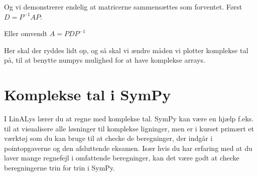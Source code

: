 \documentclass[letterpaper,10pt,english]{jupyterBook}
\begin{document}
\begin{sphinxVerbatim}[commandchars=\\\{\}]
   
 
\end{sphinxVerbatim}

\noindent{}

\noindent{}

Og vi demonstrerer endelig at matricerne sammensættes som forventet. Først \(D = P^{-1}AP\):

\begin{sphinxVerbatim}[commandchars=\\\{\}]
    
\end{sphinxVerbatim}

\noindent{}

Eller omvendt \(A = P D P^{-1}\)

\begin{sphinxVerbatim}[commandchars=\\\{\}]
    
\end{sphinxVerbatim}

\noindent{}

Her skal der ryddes lidt op, og så skal vi ændre måden vi plotter komplekse tal på, til at benytte numpys mulighed for at have komplekse arrays.


\section{Komplekse tal i SymPy}
\label{\detokenize{notebooks/sympy/Notebook_kompleks:komplekse-tal-i-sympy}}\label{\detokenize{notebooks/sympy/Notebook_kompleks::doc}}
I LinALys lærer du at regne med komplekse tal. SymPy kan være en hjælp f.eks. til at visualisere alle løsninger til komplekse ligninger, men er i kurset primært et værktøj som du kan bruge til at checke de beregninger, der indgår i pointopgaverne og den afsluttende eksamen. Især hvis du har erfaring med at du laver mange regnefejl i omfattende beregninger, kan det være godt at checke beregningerne trin for trin i SymPy.
\end{document}
